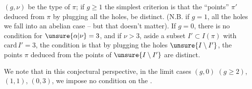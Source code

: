  $(g,\nu)$ be the type of $\pi$;  if $g\geq1$ the simplest criterion is that the ``\inserted{$\Gamma^{\natural}$-}points''  $\pi'$ deduced from $\pi$ by plugging all the holes, be distinct.  (N.B. if $g=1$,    all the holes we fall into an abelian case -- but that doesn't matter). If $g=0$,  there is no condition for $\unsure{\alpha|\nu}=3$, and if $\nu>3$,  aside a  subset $I'\subset I(\pi)$ with $\mathrm{card}\,I'=3$, the condition is that by plugging the holes  $\unsure{I\setminus I'}$, the \inserted{$\Gamma^{\natural}$-}points  $\pi$ deduced from the points of $\unsure{I\setminus I'}$ are distinct.

We note that in this conjectural perspective, in the limit cases $(g,0)$ $(g\geq2)$, $(1,1)$, $(0,3)$, we impose no condition  on the .

